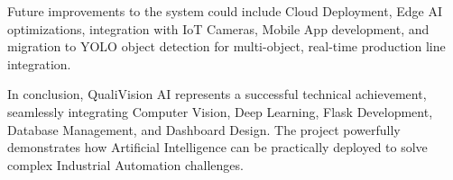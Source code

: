Future improvements to the system could include Cloud Deployment, Edge AI optimizations, integration with IoT Cameras, Mobile App development, and migration to YOLO object detection for multi-object, real-time production line integration.

In conclusion, QualiVision AI represents a successful technical achievement, seamlessly integrating Computer Vision, Deep Learning, Flask Development, Database Management, and Dashboard Design. The project powerfully demonstrates how Artificial Intelligence can be practically deployed to solve complex Industrial Automation challenges.
